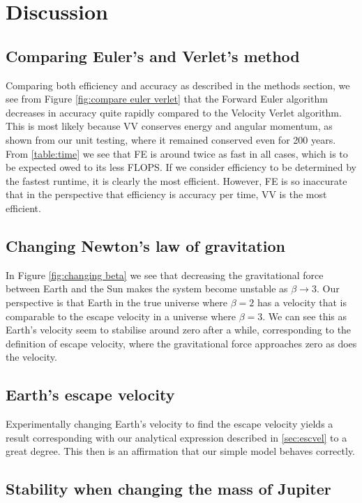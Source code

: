 \section{Discussion}
\label{sec:discussion}

\subsection{Comparing Euler's and Verlet's method}
Comparing both efficiency and accuracy as described in the methods section, we see from Figure \ref{fig:compare euler verlet}
that the Forward Euler algorithm decreases in accuracy quite rapidly compared to the Velocity Verlet algorithm. This is most likely because VV conserves energy and angular momentum, as shown from our unit testing, where it remained conserved even for 200 years. From \ref{table:time} we see that FE is around twice as fast in all cases, which is to be expected owed to its less FLOPS. If we consider efficiency to be determined by the fastest runtime, it is clearly the most efficient. However, FE is so inaccurate that in the perspective that efficiency is accuracy per time, VV is the most efficient.

\subsection{Changing Newton's law of gravitation}
In Figure \ref{fig:changing beta} we see that decreasing the gravitational force between Earth and the Sun makes the system become unstable as $\beta \rightarrow 3$. Our perspective is that Earth in the true universe where $\beta = 2$ has a velocity that is comparable to the escape velocity in a universe where $\beta = 3$. We can see this as Earth's velocity seem to stabilise around zero after a while, corresponding to the definition of escape velocity, where the gravitational force approaches zero as does the velocity.


\subsection{Earth's escape velocity}
Experimentally changing Earth's velocity to find the escape velocity yields a result corresponding with our analytical expression described in \ref{sec:escvel} to a great degree. This then is an affirmation that our simple model behaves correctly.

\subsection{Stability when changing the mass of Jupiter}

